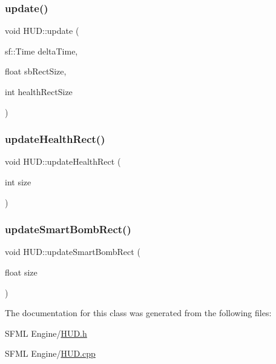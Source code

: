 \mbox{\label{class_h_u_d_a82e0269135f98973429dc257bb1c7d5a}} 
\subsubsection{\texorpdfstring{update()}{update()}}
{\footnotesize\ttfamily void H\+U\+D\+::update (\begin{DoxyParamCaption}\item[{sf\+::\+Time}]{delta\+Time,  }\item[{float}]{sb\+Rect\+Size,  }\item[{int}]{health\+Rect\+Size }\end{DoxyParamCaption})}

\mbox{\label{class_h_u_d_a6112a6edad58595a45c8f63f354615ee}} 
\subsubsection{\texorpdfstring{update\+Health\+Rect()}{updateHealthRect()}}
{\footnotesize\ttfamily void H\+U\+D\+::update\+Health\+Rect (\begin{DoxyParamCaption}\item[{int}]{size }\end{DoxyParamCaption})}

\mbox{\label{class_h_u_d_a44b111c7f1f1c246203bd87f4ebff786}} 
\subsubsection{\texorpdfstring{update\+Smart\+Bomb\+Rect()}{updateSmartBombRect()}}
{\footnotesize\ttfamily void H\+U\+D\+::update\+Smart\+Bomb\+Rect (\begin{DoxyParamCaption}\item[{float}]{size }\end{DoxyParamCaption})}



The documentation for this class was generated from the following files\+:\begin{DoxyCompactItemize}
\item 
S\+F\+M\+L Engine/\hyperlink{_h_u_d_8h}{H\+U\+D.\+h}\item 
S\+F\+M\+L Engine/\hyperlink{_h_u_d_8cpp}{H\+U\+D.\+cpp}\end{DoxyCompactItemize}
